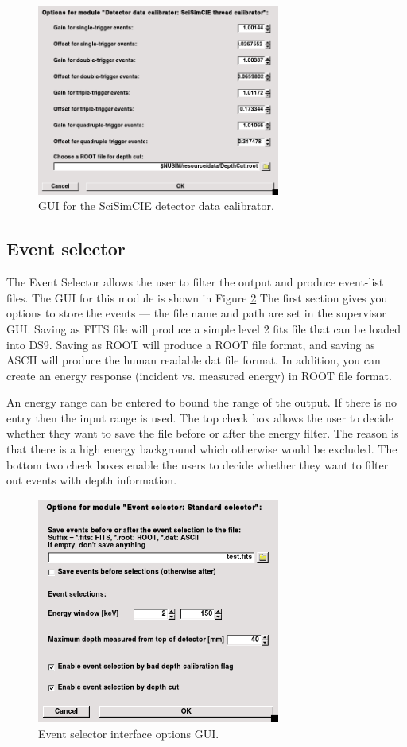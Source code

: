 \begin{figure}[tb]
 \begin{center}
  \includegraphics[width=8cm]{images/DetectorCalibratorSciSimCIEGUI.png}
  \caption{GUI for the SciSimCIE detector data calibrator.}
  \label{DCSciSimCIEGUI}
 \end{center}
\end{figure}

\subsection{Event selector}
The Event Selector allows the user to filter the output and produce event-list files. The GUI for this module is shown in Figure \ref{eventgui} The first section gives you options to store the events --- the file name and path are set in the supervisor GUI. Saving as FITS file will produce a simple level 2 fits file that can be loaded into DS9. Saving as ROOT will produce a ROOT file format, and saving as ASCII will produce the human readable dat file format. In addition, you can create an energy response (incident vs. measured energy) in ROOT file format.

An energy range can be entered to bound the range of the output. If there is no entry then the input range is used.
The top check box allows the user to decide whether they want to save the file before or after the energy filter. The reason is that there is a high energy background which otherwise would be excluded.
The bottom two check boxes enable the users to decide whether they want to filter out events with depth information.

\begin{figure}[tb]
\begin{center}
\includegraphics[width=8cm]{images/eventselectorGUI.png}  
\caption{Event selector interface options GUI.}
\label{eventgui} 
\end{center}
\end{figure}

